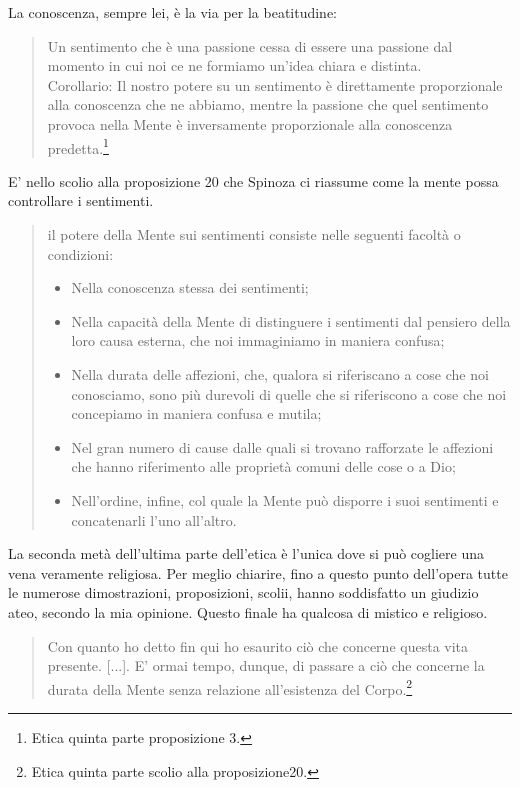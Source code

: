 La conoscenza, sempre lei, è la via per la beatitudine:

\begin{quotation}
	\small Un sentimento che è una passione cessa di essere una passione dal momento in cui noi
	ce ne formiamo un’idea chiara e distinta.\\
	Corollario: Il nostro potere su un sentimento è direttamente proporzionale alla conoscenza che ne abbiamo, mentre la passione che quel sentimento provoca nella Mente è inversamente proporzionale alla conoscenza predetta.\footnote{Etica quinta parte proposizione 3.}
\end{quotation}

E' nello scolio alla proposizione 20 che Spinoza ci riassume come la mente possa controllare i sentimenti.

\begin{quotation}
	\small il potere
	della Mente sui sentimenti consiste nelle seguenti facoltà o condizioni: 
	
	\begin{itemize}
	\item Nella conoscenza
	stessa dei sentimenti;\item  Nella capacità della Mente di distinguere i sentimenti dal pensiero
	della loro causa esterna, che noi immaginiamo in maniera confusa;\item Nella durata delle affezioni, che, qualora si riferiscano a cose che noi conosciamo, sono più durevoli di quelle
	che si riferiscono a cose che noi concepiamo in maniera confusa e mutila;\item Nel gran numero di cause dalle quali si trovano rafforzate le affezioni che hanno riferimento alle proprietà comuni delle cose o a Dio;\item Nell’ordine, infine, col quale la Mente può disporre i
	suoi sentimenti e concatenarli l’uno all’altro.
\end{itemize}
\end{quotation}

La seconda metà dell'ultima parte dell'etica è l'unica dove si può cogliere una vena veramente religiosa. Per meglio chiarire, fino a questo punto dell'opera tutte le numerose dimostrazioni, proposizioni, scolii, hanno soddisfatto un giudizio ateo, secondo la mia opinione. Questo finale ha qualcosa di mistico e religioso.

\begin{quotation}
	\small Con quanto ho detto fin qui ho esaurito ciò che concerne questa vita presente. [...]. E’ ormai tempo, dunque, di passare a ciò che concerne la durata della
	Mente senza relazione all’esistenza del Corpo.\footnote{Etica quinta parte scolio alla proposizione20.}
\end{quotation}



\newpage
